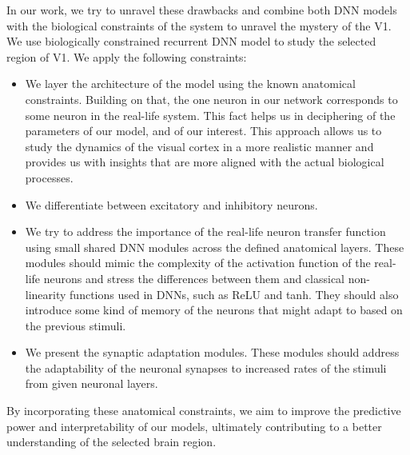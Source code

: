 In our work, we try to unravel these drawbacks and combine both DNN models
with the biological constraints of the system to unravel the mystery of 
the V1. We use biologically constrained recurrent DNN model to
study the selected region of V1. We apply the following constraints:

\begin{itemize}
    \item We layer the architecture of the
    model using the known anatomical constraints. Building on that, the one 
    neuron in our network corresponds to some neuron in the real-life system. 
    This fact helps us in deciphering of the parameters of our model, and
    of our interest. This approach allows us to study the dynamics of the 
    visual cortex in a more realistic manner and provides us with 
    insights that are more aligned with the actual biological processes.
    \item We differentiate between excitatory and inhibitory neurons.
    \item We try to address the importance of the real-life neuron transfer
    function using small shared DNN modules across the defined anatomical layers. 
    These modules should mimic the complexity of the activation function 
    of the real-life neurons and stress the differences between them and 
    classical non-linearity functions used in DNNs, such as ReLU and tanh.
    They should also introduce some kind of memory of the neurons that might
    adapt to based on the previous stimuli.
    \item We present the synaptic adaptation modules. These modules should address
    the adaptability of the neuronal synapses to increased rates of the stimuli 
    from given neuronal layers.
\end{itemize}

By incorporating these anatomical constraints, we aim to improve 
the predictive power and interpretability of our models, ultimately 
contributing to a better understanding of the selected brain region.

